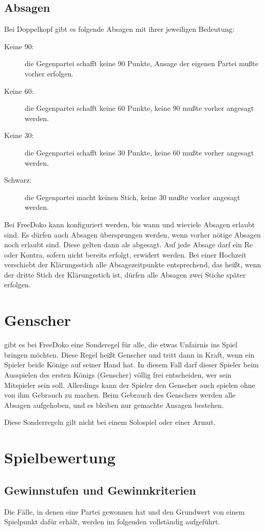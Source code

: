 \documentclass{scrartcl}
\begin{document}
\subsection{Absagen}
Bei Doppelkopf gibt es folgende Absagen mit ihrer jeweiligen Bedeutung:
\begin{description}
  \item[Keine 90:] die Gegenpartei schafft keine 90 Punkte, Ansage der eigenen Partei mußte vorher
    erfolgen.
  \item[Keine 60:] die Gegenpartei schafft keine 60 Punkte, keine 90 mußte vorher angesagt
    werden.
  \item[Keine 30:] die Gegenpartei schafft keine 30 Punkte, keine 60 mußte vorher angesagt
    werden.
  \item[Schwarz:] die Gegenpartei macht keinen Stich, keine 30 mußte vorher angesagt
    werden.
\end{description}
Bei FreeDoko kann \optional konfiguriert werden, bis wann und wieviele Absagen erlaubt sind. Es dürfen auch Absagen übersprungen werden, wenn vorher nötige Absagen noch erlaubt sind. Diese gelten dann als abgesagt. Auf jede Absage darf \optional ein Re oder Kontra, sofern nicht bereits erfolgt, erwidert werden. Bei einer Hochzeit verschiebt der Klärungsstich alle Absagezeitpunkte entsprechend, das heißt, wenn der dritte Stich der Klärungsstich ist, dürfen alle Absagen zwei Stiche später erfolgen.

\section{Genscher}
\Optional gibt es bei FreeDoko eine Sonderegel für alle, die etwas Unfairnis ins Spiel bringen möchten. Diese Regel heißt Genscher und tritt dann in Kraft, wenn ein Spieler beide \karo Könige auf seiner Hand hat. In diesem Fall darf dieser Spieler beim Ausspielen des ersten \karo Königs (Genscher) völlig frei entscheiden, wer sein Mitspieler sein soll. Allerdings kann der Spieler den Genscher auch spielen ohne von ihm Gebrauch zu machen.  Beim Gebrauch des Genschers werden alle Absagen aufgehoben, und es bleiben nur gemachte Ansagen bestehen.

Diese Sonderregeln gilt nicht bei einem Solospiel oder einer Armut.

\section{Spielbewertung}

\subsection{Gewinnstufen und Gewinnkriterien}
Die Fälle, in denen eine Partei gewonnen hat und den Grundwert von einem Spielpunkt dafür erhält, werden im folgenden vollständig aufgeführt.
\end{document}
